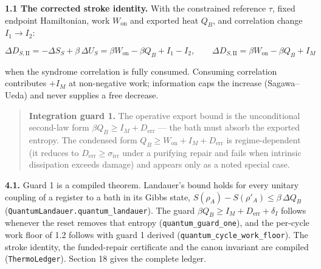 \documentclass[
]{article}
\begin{document}
\textbf{1.1 The corrected stroke identity.} With the constrained
reference \(\tau\), fixed endpoint Hamiltonian, work \(W_{\mathrm{on}}\)
and exported heat \(Q_B\), and correlation change \(I_1\to I_2\):

\[
\Delta D_{S,\mathrm{II}}=-\Delta S_S+\beta\,\Delta U_S=\beta W_{\mathrm{on}}-\beta Q_B+I_1-I_2,
\qquad
\Delta D_{S,\mathrm{II}}=\beta W_{\mathrm{on}}-\beta Q_B+I_M
\]

when the syndrome correlation is fully consumed. Consuming correlation
contributes \textbf{\(+I_M\)} at non-negative work; information caps the
increase (Sagawa--Ueda) and never supplies a free decrease.

\begin{quote}
\textbf{Integration guard 1.} The operative export bound is the
unconditional second-law form
\(\boxed{\beta Q_B\ge I_M+D_{\mathrm{err}}}\) --- the bath must absorb
the exported entropy. The condensed form
\(Q_B\ge W_{\mathrm{on}}+I_M+D_{\mathrm{err}}\) is regime-dependent (it
reduces to \(D_{\mathrm{err}}\ge\sigma_{\mathrm{irr}}\) under a
purifying repair and fails when intrinsic dissipation exceeds damage)
and appears only as a noted special case.
\end{quote}

\textbf{4.1.} Guard 1 is a compiled theorem. Landauer's bound holds for
every unitary coupling of a register to a bath in its Gibbs state,
\(S(\rho_A)-S(\rho'_A)\le\beta\,\Delta Q_B\)
(\texttt{Q\allowbreak{}u\allowbreak{}a\allowbreak{}n\allowbreak{}t\allowbreak{}u\allowbreak{}m\allowbreak{}L\allowbreak{}a\allowbreak{}n\allowbreak{}d\allowbreak{}a\allowbreak{}u\allowbreak{}e\allowbreak{}r\allowbreak{}.\allowbreak{}q\allowbreak{}u\allowbreak{}a\allowbreak{}n\allowbreak{}t\allowbreak{}u\allowbreak{}m\allowbreak{}\_\allowbreak{}l\allowbreak{}a\allowbreak{}n\allowbreak{}d\allowbreak{}a\allowbreak{}u\allowbreak{}e\allowbreak{}r}).
The guard \(\beta Q_B\ge I_M+D_{\mathrm{err}}+\delta_I\) follows
whenever the reset removes that entropy
(\texttt{q\allowbreak{}u\allowbreak{}a\allowbreak{}n\allowbreak{}t\allowbreak{}u\allowbreak{}m\allowbreak{}\_\allowbreak{}g\allowbreak{}u\allowbreak{}a\allowbreak{}r\allowbreak{}d\allowbreak{}\_\allowbreak{}o\allowbreak{}n\allowbreak{}e}),
and the per-cycle work floor of 1.2 follows with guard 1 derived
(\texttt{q\allowbreak{}u\allowbreak{}a\allowbreak{}n\allowbreak{}t\allowbreak{}u\allowbreak{}m\allowbreak{}\_\allowbreak{}c\allowbreak{}y\allowbreak{}c\allowbreak{}l\allowbreak{}e\allowbreak{}\_\allowbreak{}w\allowbreak{}o\allowbreak{}r\allowbreak{}k\allowbreak{}\_\allowbreak{}f\allowbreak{}l\allowbreak{}o\allowbreak{}o\allowbreak{}r}).
The stroke identity, the funded-repair certificate and the canon
invariant are compiled (\texttt{ThermoLedger}). Section 18 gives the
complete ledger.
\end{document}
